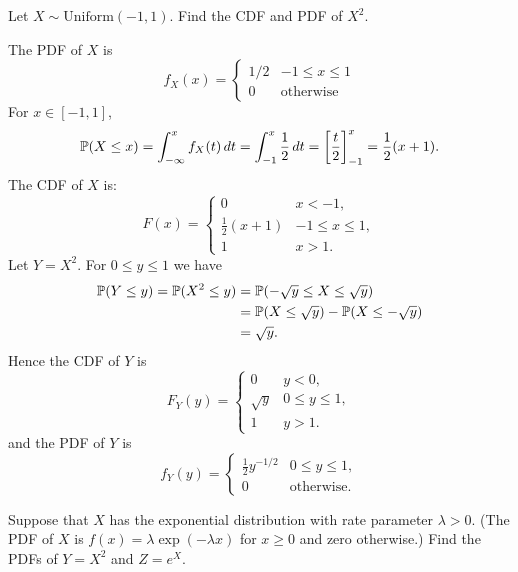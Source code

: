 \begin{exercise}
\begin{questions}

\question %
Let $X\sim\text{Uniform}(-1,1)$. Find the CDF and PDF of $X^2$.

\begin{answer}
The PDF of $X$ is 
\[
f_X(x) = \left\{\begin{array}{ll}
	1/2	& -1\leq x\leq 1 \\
	0	& \text{otherwise}
\end{array}\right.	
\]	
For $x\in[-1,1]$, 
\[
\mathbb{P}(X\leq x) 
	= \int_{-\infty}^x f_X(t)\,dt
	= \int_{-1}^x \frac{1}{2}\,dt
	= \left[\frac{t}{2}\right]_{-1}^x
	= \frac{1}{2}(x+1).
\]
The CDF of $X$ is:
\[
F(x) = \left\{\begin{array}{ll}
	0				 	& x < -1, \\
	\frac{1}{2}(x+1) 	& -1\leq x\leq 1, \\
	1					& x > 1.
\end{array}\right.	
\]
Let $Y=X^2$. For $0\leq y\leq 1$ we have
\begin{align*}
\mathbb{P}(Y\leq y)
	= \mathbb{P}(X^2\leq y)
	& = \mathbb{P}(-\sqrt{y}\leq X\leq\sqrt{y}) \\
	& = \mathbb{P}(X\leq\sqrt{y}) - \mathbb{P}(X\leq-\sqrt{y}) \\
	& = \sqrt{y}.
\end{align*}
Hence the CDF of $Y$ is
\[
F_Y(y) = \left\{\begin{array}{ll}
	0		 	& y < 0, \\
	\sqrt{y} 	& 0\leq y\leq 1, \\
	1			& y > 1.
\end{array}\right.	
\]
and the PDF of $Y$ is
\[
f_Y(y) = \left\{\begin{array}{ll}
\frac{1}{2}y^{-1/2}	& 0\leq y\leq 1, \\
0					& \text{otherwise}.
\end{array}\right.	
\]
\end{answer}

\question %
Suppose that $X$ has the exponential distribution with rate parameter $\lambda>0$. (The PDF of $X$ is $f(x) = \lambda\exp(-\lambda x)$ for $x \geq 0$ and zero otherwise.)
Find the PDFs of $Y=X^2$ and $Z=e^X$.


\end{questions}
\end{exercise}

